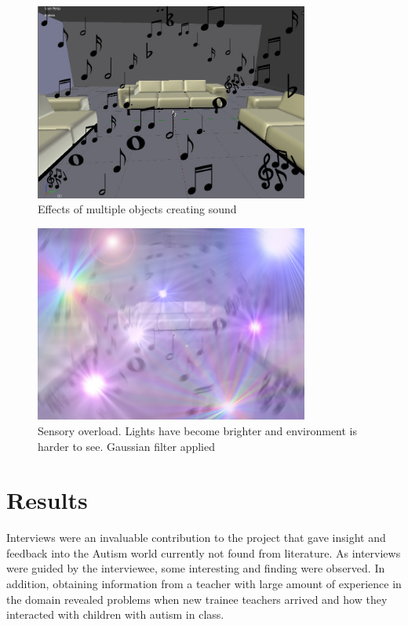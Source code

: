 \begin{figure}[H]
\centering
\includegraphics[width=90mm]{images/design/GD_moresound.jpg}
\caption{Effects of multiple objects creating sound}
\label{sensorymockup2}
\end{figure}

\begin{figure}[H]
\centering
\includegraphics[width=90mm]{images/design/GD_overload.jpg}
\caption{Sensory overload. Lights have become brighter and environment is harder to see. Gaussian filter applied}
\label{sensorymockup3}
\end{figure}

\section{Results}
Interviews were an invaluable contribution to the project that gave insight and feedback into the Autism world currently not found from literature. As interviews were guided by the interviewee, some interesting and finding were observed. In addition, obtaining information from a teacher with large amount of experience in the domain revealed problems when new trainee teachers arrived and how they interacted with children with autism in class.  

